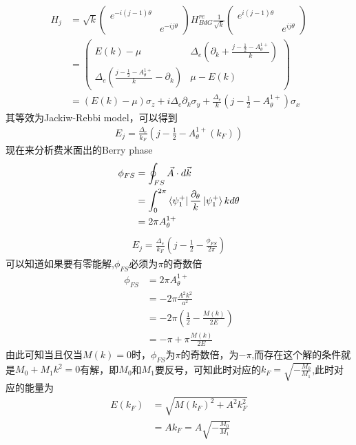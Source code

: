 \documentclass[22pt]{article}
\begin{document}
\begin{align}
	H_j&=\sqrt{k}
	\begin{pmatrix}
		e^{-i(j-1)\theta} &\\
		&e^{-ij\theta}
	\end{pmatrix}
H_{BdG}^{re}
\frac{1}{\sqrt{k}}
\begin{pmatrix}
	e^{i(j-1)\theta} &\\
	& e^{ij\theta}
\end{pmatrix}\\
&=
\begin{pmatrix}
	E(k)-\mu  & \Delta_e(\partial_k+\frac{j-\frac{1}{2}-A_{\theta}^{1+}}{k})\\
	\Delta_e(\frac{j-\frac{1}{2}-A_{\theta}^{1+}}{k}-\partial_k) & \mu-E(k)
\end{pmatrix}
\\
&=(E(k)-\mu)\sigma_z+i\Delta_e\partial_k\sigma_y+\frac{\Delta_e}{k}(j-\frac{1}{2}-A_{\theta}^{1+})\sigma_x
\end{align}                      
其等效为Jackiw-Rebbi model，可以得到
\begin{align}
	E_j=\frac{\Delta_e}{k_F}(j-\frac{1}{2}-A_{\theta}^{1+}(k_F))
\end{align}
现在来分析费米面出的Berry phase
\begin{align}
			\phi_{FS}&=\oint_{FS}\vec{A}\cdot d\vec{k}\\
			&=\int_0^{2\pi}\bra{\psi_{1}^{+}}\frac{\partial_{\theta}}{k}\ket{\psi_{1}^{+}}kd\theta\\
			&=2\pi A_{\theta}^{1+}
\end{align}
\begin{align}
	E_j=\frac{\Delta_e}{k_F}(j-\frac{1}{2}-\frac{\phi_{FS}}{2\pi})
\end{align}
可以知道如果要有零能解,$\phi_{FS}$必须为$\pi$的奇数倍
\begin{align}
	\phi_{FS}&=2\pi A_{\theta}^{1+}			\\
	&=-2\pi\frac{A^2k^2}{a^2}\\
	&=-2\pi(\frac{1}{2}-\frac{M(k)}{2E})\\
	&=-\pi+\pi\frac{M(k)}{2E}
\end{align}
由此可知当且仅当$M(k)=0$时，$\phi_{FS}$为$\pi$的奇数倍，为$-\pi$,而存在这个解的条件就是$M_0+M_1k^2=0$有解，即$M_0$和$M_1$要反号，可知此时对应的$k_F=\sqrt{-\frac{M_0}{M_1}}$,此时对应的能量为
\begin{align}
			E(k_F)&=\sqrt{M(k_F)^2+A^2k_F^2}\\
			&=Ak_F=A\sqrt{-\frac{M_0}{M_1}}
\end{align}
\end{document}
